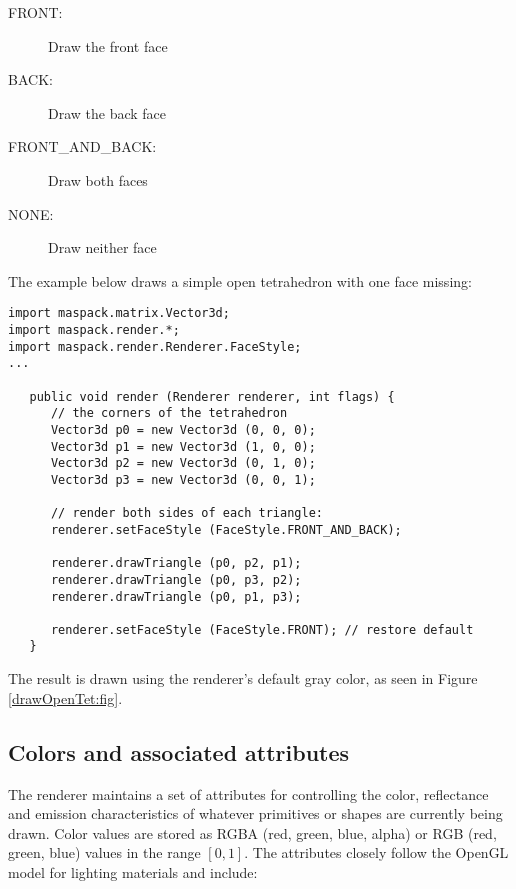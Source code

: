 \begin{description}

\item[FRONT:]\mbox{} 

Draw the front face

\item[BACK:]\mbox{} 

Draw the back face

\item[FRONT\_AND\_BACK:]\mbox{} 

Draw both faces

\item[NONE:]\mbox{} 

Draw neither face

\end{description}
The example below draws a simple open tetrahedron with one face missing:
%
\begin{lstlisting}[]
import maspack.matrix.Vector3d;
import maspack.render.*;
import maspack.render.Renderer.FaceStyle;
...
   
   public void render (Renderer renderer, int flags) {
      // the corners of the tetrahedron
      Vector3d p0 = new Vector3d (0, 0, 0);
      Vector3d p1 = new Vector3d (1, 0, 0);
      Vector3d p2 = new Vector3d (0, 1, 0);
      Vector3d p3 = new Vector3d (0, 0, 1);
         
      // render both sides of each triangle:
      renderer.setFaceStyle (FaceStyle.FRONT_AND_BACK); 
      
      renderer.drawTriangle (p0, p2, p1);
      renderer.drawTriangle (p0, p3, p2);
      renderer.drawTriangle (p0, p1, p3);
      
      renderer.setFaceStyle (FaceStyle.FRONT); // restore default
   }
\end{lstlisting}
%
The result is drawn using the renderer's default gray color, as seen
in Figure \ref{drawOpenTet:fig}.

\subsection{Colors and associated attributes}
\label{colors:sec}

The renderer maintains a set of attributes for controlling the color,
reflectance and emission characteristics of whatever primitives or
shapes are currently being drawn. Color values are stored as RGBA
(red, green, blue, alpha) or RGB (red, green, blue) values in the
range $[0,1]$. The attributes closely follow the OpenGL model for
lighting materials and include:


